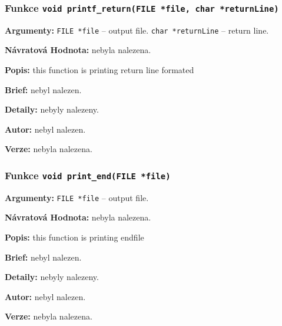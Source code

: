 \documentclass[12pt, a4paper]{article}
\begin{document}
\subsubsection{Funkce \texttt{void printf\_return(FILE *file, char *returnLine)}}
\textbf{Argumenty: }\verb"FILE *file" -- output file. \verb"char *returnLine" -- return line. \\
\par\noindent
\textbf{Návratová Hodnota: }nebyla nalezena.\\
\par\noindent
\textbf{Popis: }this function is printing return line formated\\
\par\noindent
\textbf{Brief: }nebyl nalezen.\\
\par\noindent
\textbf{Detaily: }nebyly nalezeny.\\
\par\noindent
\textbf{Autor: }nebyl nalezen.\\
\par\noindent
\textbf{Verze: }nebyla nalezena.\\
\par\noindent
\subsubsection{Funkce \texttt{void print\_end(FILE *file)}}
\textbf{Argumenty: }\verb"FILE *file" -- output file. \\
\par\noindent
\textbf{Návratová Hodnota: }nebyla nalezena.\\
\par\noindent
\textbf{Popis: }this function is printing endfile\\
\par\noindent
\textbf{Brief: }nebyl nalezen.\\
\par\noindent
\textbf{Detaily: }nebyly nalezeny.\\
\par\noindent
\textbf{Autor: }nebyl nalezen.\\
\par\noindent
\textbf{Verze: }nebyla nalezena.\\
\par\noindent
\end{document}
